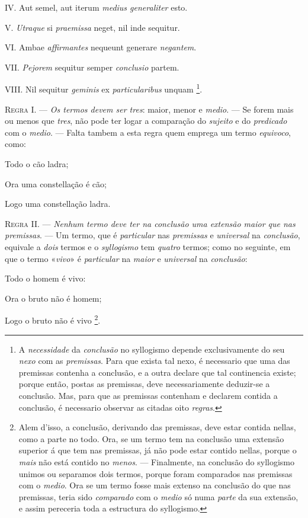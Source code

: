 IV. Aut semel, aut iterum \emph{medius generaliter} esto.

V. \emph{Utraque} si \emph{praemissa} neget, nil inde sequitur.

VI. Ambae \emph{affirmantes} nequeunt generare \emph{negantem}.

VII. \emph{Pejorem} sequitur semper \emph{conclusio} partem.

VIII. Nil sequitur \emph{geminis} ex \emph{particularibus} unquam \footnote{A \emph{necessidade} da \emph{conclusão} no syllogismo depende exclusivamente do seu \emph{nexo} com as \emph{premissas}. Para que exista tal nexo, é necessario que uma das premissas contenha a conclusão, e a outra declare que tal continencia existe; porque então, postas as premissas, deve necessariamente deduzir-se a conclusão. Mas, para que as premissas contenham e declarem contida a conclusão, é necessario observar as citadas oito \emph{regras}.}.

\textsc{Regra} I. --- \emph{Os termos devem ser tres}: maior, menor e \emph{medio}. --- Se forem mais ou menos que \emph{tres}, não pode ter logar a comparação do \emph{sujeito} e do \emph{predicado} com o \emph{medio}. --- Falta tambem a esta regra quem emprega um termo \emph{equivoco}, como:

Todo o cão ladra;

Ora uma constellação é cão;

Logo uma constellação ladra.

\textsc{Regra} II. --- \emph{Nenhum termo deve ter na conclusão uma extensão maior que nas premissas}. --- Um termo, que é \emph{particular} nas \emph{premissas} e \emph{universal} na \emph{conclusão}, equivale a \emph{dois} termos e o \emph{syllogismo} tem \emph{quatro} termos; como no seguinte, em que o termo «\emph{vivo}» é \emph{particular} na \emph{maior} e \emph{universal} na \emph{conclusão}:

Todo o homem é vivo:

Ora o bruto não é homem;

Logo o bruto não é vivo \footnote{Alem d'isso, a conclusão, derivando das premissas, deve estar contida nellas, como a parte no todo. Ora, se um termo tem na conclusão uma extensão superior á que tem nas premissas, já não pode estar contido nellas, porque o \emph{mais} não está contido no \emph{menos}. --- Finalmente, na conclusão do syllogismo unimos ou separamos dois termos, porque foram comparados nas premissas com o \emph{medio}. Ora se um termo fosse mais extenso na conclusão do que nas premissas, teria sido \emph{comparado} com o \emph{medio} só numa \emph{parte} da sua extensão, e assim pereceria toda a estructura do syllogismo.}.

